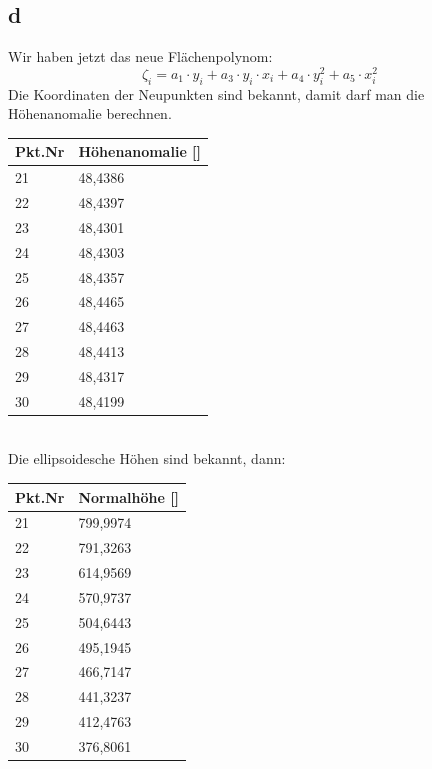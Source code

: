 \subsection{d}
Wir haben jetzt das neue Flächenpolynom:
\begin{equation*}
	\zeta_i = a_1 \cdot y_i + a_3 \cdot y_i \cdot x_i + a_4 \cdot y_i^2 + a_5 \cdot x_i^2
\end{equation*}
Die Koordinaten der Neupunkten sind bekannt, damit darf man die Höhenanomalie berechnen.
\begin{table}[ht] \centering
	\begin{tabular}{|l|l|}
		\hline
		Pkt.Nr & Höhenanomalie [\ut{m}] \\ \hline
		21     & 48,4386       \\ \hline
		22     & 48,4397       \\ \hline
		23     & 48,4301       \\ \hline
		24     & 48,4303       \\ \hline
		25     & 48,4357       \\ \hline
		26     & 48,4465       \\ \hline
		27     & 48,4463       \\ \hline
		28     & 48,4413       \\ \hline
		29     & 48,4317       \\ \hline
		30    & 48,4199       \\ \hline
	\end{tabular}
\end{table}\\
Die ellipsoidesche Höhen sind bekannt, dann: 
\begin{table}[ht] \centering
	\begin{tabular}{|l|l|}
		\hline
		Pkt.Nr & Normalhöhe [\ut{m}] \\ \hline
		21     & 799,9974       \\ \hline
		22     & 791,3263       \\ \hline
		23     & 614,9569       \\ \hline
		24     & 570,9737      \\ \hline
		25     & 504,6443    \\ \hline
		26     & 495,1945       \\ \hline
		27     & 466,7147       \\ \hline
		28     & 441,3237       \\ \hline
		29     & 412,4763       \\ \hline
		30     & 376,8061      \\ \hline
	\end{tabular}
\end{table}
\newpage
